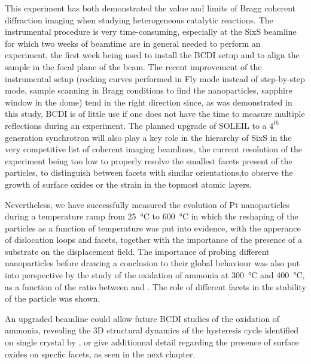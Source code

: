 This experiment has both demonstrated the value and limits of Bragg coherent diffraction imaging when studying heterogeneous catalytic reactions.
The instrumental procedure is very time-consuming, especially at the SixS beamline for which two weeks of beamtime are in general needed to perform an experiment, the first week being used to install the BCDI setup and to align the sample in the focal plane of the beam.
The recent improvement of the instrumental setup (rocking curves performed in Fly mode instead of step-by-step mode, sample scanning in Bragg conditions to find the nanoparticles, sapphire window in the dome) tend in the right direction since, as was demonstrated in this study, BCDI is of little use if one does not have the time to measure multiple reflections during an experiment.
The planned upgrade of SOLEIL to a $4^{th}$ generation synchrotron will also play a key role in the hierarchy of SixS in the very competitive list of coherent imaging beamlines, the current resolution of the experiment being too low to properly resolve the smallest facets present of the particles, to distinguish between facets with similar orientations,to observe the growth of surface oxides or the strain in the topmost atomic layers.

Nevertheless, we have successfully measured the evolution of Pt nanoparticles during a temperature ramp from \qty{25}{\degreeCelsius} to \qty{600}{\degreeCelsius} in which the reshaping of the particles as a function of temperature was put into evidence, with the apperance of dislocation loops and facets, together with the importance of the presence of a substrate on the displacement field.
The importance of probing different nanoparticles before drawing a conclusion to their global behaviour was also put into perspective by the study of the oxidation of ammonia at \qty{300}{\degreeCelsius} and \qty{400}{\degreeCelsius}, as a function of the ratio between \argon and \ammonia.
The role of different facets in the stability of the particle was shown.

An upgraded beamline could allow future BCDI studies of the oxidation of ammonia, revealing the 3D structural dynamics of the hysteresis cycle identified on single crystal by \cite{Resta2020a}, or give additionnal detail regarding the presence of surface oxides on specfic facets, as seen in the next chapter.
